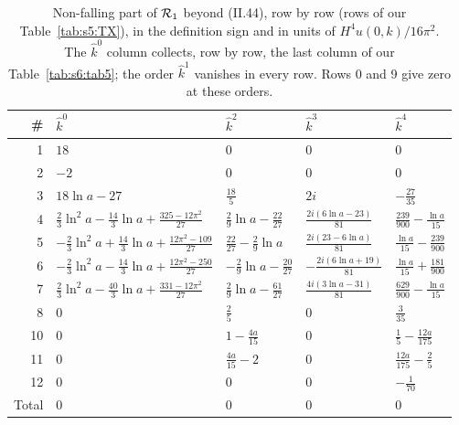 \documentclass[aps,prd,onecolumn,10pt,nofootinbib,floatfix]{revtex4-2}
\newcommand{\eqII}[1]{(II.#1)}
\newcommand{\khat}{\hat k}
\begin{document}
\begin{table}[htbp]
\caption{Non-falling part of $\mathcal{R}_1$ beyond \eqII{44}, row by row (rows of our Table~\ref{tab:s5:TX}), in the
definition sign and in units of $H^4u(0,k)/16\pi^2$. The $\khat^0$ column collects, row by row, the last column of our Table~\ref{tab:s6:tab5}; the order $\khat^1$
vanishes in every row. Rows 0 and 9 give zero at these orders.}
\label{tab:s6:t5pp}
\renewcommand{\arraystretch}{1.4}
\begin{ruledtabular}
\begin{tabular}{r l l l l}
\# & $\khat^0$ & $\khat^2$ & $\khat^3$ & $\khat^4$\\
\hline
1 & $18$ & $0$ & $0$ & $0$\\
2 & $-2$ & $0$ & $0$ & $0$\\
3 & $18\ln a-27$ & $\frac{18}5$ & $2i$ & $-\frac{27}{35}$\\
4 & $\frac23\ln^2a-\frac{14}3\ln a+\frac{325-12\pi^2}{27}$ & $\frac29\ln a-\frac{22}{27}$ & $\frac{2i(6\ln a-23)}{81}$ & $\frac{239}{900}-\frac{\ln a}{15}$\\
5 & $-\frac23\ln^2a+\frac{14}3\ln a+\frac{12\pi^2-109}{27}$ & $\frac{22}{27}-\frac29\ln a$ & $\frac{2i(23-6\ln a)}{81}$ & $\frac{\ln a}{15}-\frac{239}{900}$\\
6 & $-\frac23\ln^2a-\frac{14}3\ln a+\frac{12\pi^2-250}{27}$ & $-\frac29\ln a-\frac{20}{27}$ & $-\frac{2i(6\ln a+19)}{81}$ & $\frac{\ln a}{15}+\frac{181}{900}$\\
7 & $\frac23\ln^2a-\frac{40}3\ln a+\frac{331-12\pi^2}{27}$ & $\frac29\ln a-\frac{61}{27}$ & $\frac{4i(3\ln a-31)}{81}$ & $\frac{629}{900}-\frac{\ln a}{15}$\\
8 & $0$ & $\frac25$ & $0$ & $\frac3{35}$\\
10 & $0$ & $1-\frac{4a}{15}$ & $0$ & $\frac15-\frac{12a}{175}$\\
11 & $0$ & $\frac{4a}{15}-2$ & $0$ & $\frac{12a}{175}-\frac25$\\
12 & $0$ & $0$ & $0$ & $-\frac1{70}$\\
\hline
Total & $0$ & $0$ & $0$ & $0$\\
\end{tabular}
\end{ruledtabular}
\end{table}
\end{document}

